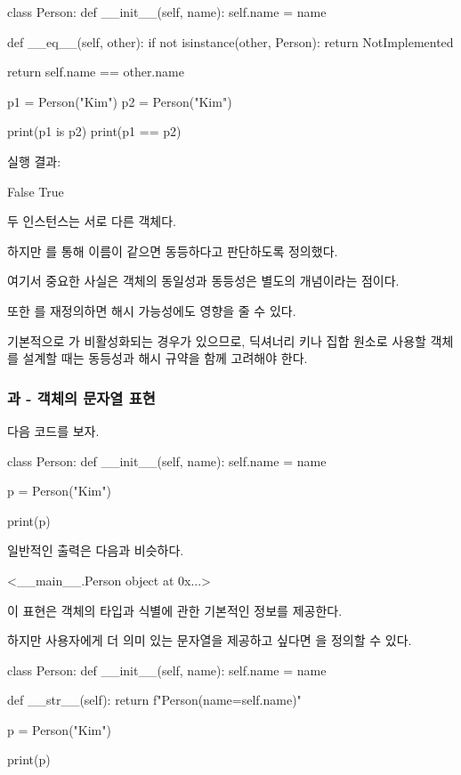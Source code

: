 \begin{dhkcode}
class Person:
    def __init__(self, name):
        self.name = name

    def __eq__(self, other):
        if not isinstance(other, Person):
            return NotImplemented

        return self.name == other.name

p1 = Person("Kim")
p2 = Person("Kim")

print(p1 is p2)
print(p1 == p2)
\end{dhkcode}

실행 결과:

\begin{dhkzsh}
False
True
\end{dhkzsh}

두 인스턴스는 서로 다른 객체다.

하지만 를 통해 이름이 같으면 동등하다고 판단하도록 정의했다.

여기서 중요한 사실은 객체의 동일성과 동등성은 별도의 개념이라는 점이다.

또한 를 재정의하면 해시 가능성에도 영향을 줄 수 있다.

기본적으로 가 비활성화되는 경우가 있으므로, 딕셔너리 키나 집합 원소로 사용할 객체를 설계할 때는 동등성과 해시 규약을 함께 고려해야 한다.

\subsubsection{과  - 객체의 문자열 표현}

다음 코드를 보자.

\begin{dhkcode}
class Person:
    def __init__(self, name):
        self.name = name

p = Person("Kim")

print(p)
\end{dhkcode}

일반적인 출력은 다음과 비슷하다.

\begin{dhkzsh}
<__main__.Person object at 0x...>
\end{dhkzsh}

이 표현은 객체의 타입과 식별에 관한 기본적인 정보를 제공한다.

하지만 사용자에게 더 의미 있는 문자열을 제공하고 싶다면 을 정의할 수 있다.

\begin{dhkcode}
class Person:
    def __init__(self, name):
        self.name = name

    def __str__(self):
        return f"Person(name={self.name})"

p = Person("Kim")

print(p)
\end{dhkcode}

